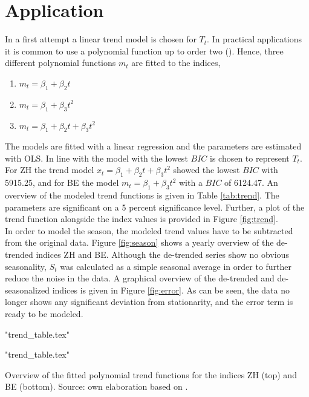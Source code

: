 \documentclass[11pt]{article}
\begin{document}
\section{Application}
In a first attempt a linear trend model is chosen for \(T_t\). In practical applications it is common to use a polynomial function up to order two (\cite{schlittAPPLIED}). Hence, three different polynomial functions \(m_t\) are fitted to the indices,
\begin{enumerate}
	\item \(m_t=\beta_1+\beta_2t\)
	\item \(m_t=\beta_1+\beta_3t^2\)
	\item \(m_t=\beta_1+\beta_2t+\beta_3t^2\)
\end{enumerate}
The models are fitted with a linear regression and the parameters are estimated with OLS. In line with \cite{schlittAPPLIED} the model with the lowest \(BIC\) is chosen to represent \(T_t\).
 For ZH the trend model \(x_t=\beta_1+\beta_2t+\beta_3t^2\) showed the lowest \(BIC\) with 5915.25, and for BE the model \(m_t=\beta_1+\beta_3t^2\) with a \(BIC\) of 6124.47.
 An overview of the modeled trend functions is given in Table \ref{tab:trend}. The parameters are significant on a 5 percent significance level. Further, a plot of the trend function alongside the index values is provided in Figure \ref{fig:trend}.
 \\
In order to model the season, the modeled trend values have to be subtracted from the original data. Figure \ref{fig:season} shows a yearly overview of the de-trended indices ZH and BE. Although the de-trended series show no obvious seasonality, \(S_t\) was calculated as a simple seasonal average in order to further reduce the noise in the data. A graphical overview of the de-trended and de-seasonalized indices is given in Figure \ref{fig:error}. As can be seen, the data no longer shows any significant deviation from stationarity, and the error term is ready to be modeled.
\begin{table}[p]
	\centering
	\begin{minipage}{1\linewidth}
		\centering
		{"trend_table.tex"}
		\vspace*{0.7 cm}
	\end{minipage}
	\begin{minipage}{1\linewidth}
		\centering
		{"trend_table.tex"}
		\vspace*{0.7 cm}
	\end{minipage}
	\caption{Overview of the fitted polynomial trend functions for the indices ZH (top) and BE (bottom). Source: own elaboration based on \cite{googleT}.}
	\label{tab:trend}
\end{table}
\end{document}
